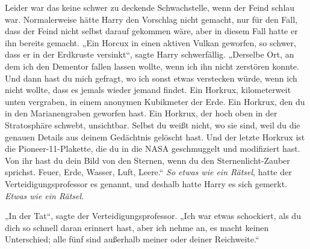 Leider war das keine schwer zu deckende Schwachstelle, wenn der Feind schlau war.
Normalerweise hätte Harry den Vorschlag nicht gemacht, nur für den Fall, dass der Feind nicht selbst darauf gekommen wäre, aber in diesem Fall hatte er ihn bereits gemacht.
„Ein Horcux in einen aktiven Vulkan geworfen, so schwer, dass er in der Erdkruste versinkt“, sagte Harry schwerfällig. „Derselbe Ort, an dem ich den Dementor fallen lassen wollte, wenn ich ihn nicht zerstören konnte. Und dann hast du mich gefragt, wo ich sonst etwas verstecken würde, wenn ich nicht wollte, dass es jemals wieder jemand findet. Ein Horkrux, kilometerweit unten vergraben, in einem anonymen Kubikmeter der Erde. Ein Horkrux, den du in den Marianengraben geworfen hast. Ein Horkrux, der hoch oben in der Stratosphäre schwebt, unsichtbar. Selbst du weißt nicht, wo sie sind, weil du die genauen Details aus deinem Gedächtnis gelöscht hast. Und der letzte Horkrux ist die Pioneer-11-Plakette, die du in die NASA geschmuggelt und modifiziert hast. Von ihr hast du dein Bild von den Sternen, wenn du den Sternenlicht-Zauber sprichst. Feuer, Erde, Wasser, Luft, Leere.“
\emph{So etwas wie ein Rätsel}, hatte der Verteidigungsprofessor es genannt, und deshalb hatte Harry es sich gemerkt.
\emph{Etwas wie ein Rätsel.}%

„In der Tat“, sagte der Verteidigungsprofessor. „Ich war etwas schockiert, als du dich so schnell daran erinnert hast, aber ich nehme an, es macht keinen Unterschied; alle fünf sind außerhalb meiner oder deiner Reichweite.“

